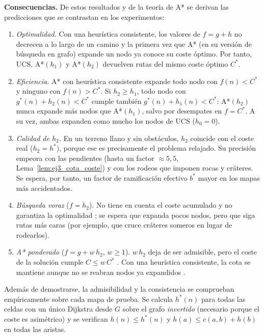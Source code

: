 \textbf{Consecuencias.} De estos resultados y de la teoría de A*
\cite{hart1968, russell2022} se derivan las predicciones que se contrastan
en los experimentos:
\begin{enumerate}
  \item \emph{Optimalidad.} Con una heurística consistente, los valores de
  $f = g + h$ no decrecen a lo largo de un camino y la primera vez que A*
  (en su versión de búsqueda en grafo) expande un nodo ya conoce su coste
  óptimo. Por tanto, UCS, A*$(h_1)$ y A*$(h_2)$ devuelven rutas del mismo
  coste óptimo $C^*$.
  \item \emph{Eficiencia.} A* con heurística consistente expande todo nodo
  con $f(n) < C^*$ y ninguno con $f(n) > C^*$. Si $h_2 \ge h_1$, todo nodo
  con $g^*(n) + h_2(n) < C^*$ cumple también $g^*(n) + h_1(n) < C^*$: A*$(h_2)$
  nunca expande más nodos que A*$(h_1)$, salvo por desempates en
  $f = C^*$. A su vez, ambas expanden como mucho los nodos de UCS
  ($h_0 = 0$).
  \item \emph{Calidad de $h_2$.} En un terreno llano y sin obstáculos, $h_2$
  coincide con el coste real ($h_2 = h^*$), porque ese es precisamente el
  problema relajado. Su precisión empeora con las pendientes (hasta un factor
  $\approx 5{,}5$, Lema~\ref{lem:ej3_cota_coste}) y con los rodeos que
  imponen rocas y cráteres. Se espera, por tanto, un factor de ramificación
  efectivo $b^*$ mayor en los mapas más accidentados.
  \item \emph{Búsqueda voraz} ($f = h_2$). No tiene en cuenta el coste
  acumulado y no garantiza la optimalidad \cite{russell2022}; se espera que
  expanda pocos nodos, pero que siga rutas más caras (por ejemplo, que cruce
  cráteres someros en lugar de rodearlos).
  \item \emph{A* ponderado} ($f = g + w\,h_2$, $w \ge 1$). $w\,h_2$ deja de
  ser admisible, pero el coste de la solución cumple $C \le w\,C^*$
  \cite{pohl1970}. Con una heurística consistente, la cota se mantiene aunque
  no se reabran nodos ya expandidos \cite{likhachev2003}.
\end{enumerate}

Además de demostrarse, la admisibilidad y la consistencia se comprueban
empíricamente sobre cada mapa de prueba. Se calcula $h^*(n)$ para todas las
celdas con un único Dijkstra desde $G$ sobre el grafo \emph{invertido}
(necesario porque el coste es asimétrico) y se verifican $h(n) \le h^*(n)$
y $h(a) \le c(a,b) + h(b)$ en todas las aristas.




